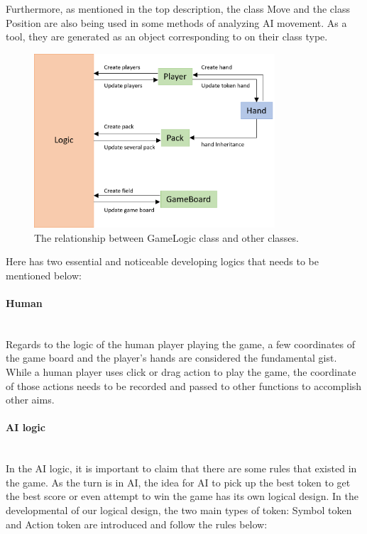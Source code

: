 Furthermore, as mentioned in the top description, the class Move and the class Position are also being used in some methods of analyzing AI movement.  As a tool, they are generated as an object corresponding to on their class type.


\begin{figure}[h]
	\centering
	\includegraphics[width=0.8\textwidth]{image/diagram_4}
	\caption{The relationship between GameLogic class and other classes.}
	\label{fig:gameLogic}
\end{figure}


Here has two essential and noticeable developing logics that needs to be mentioned below:

\paragraph{Human} \mbox{}\\
Regards to the logic of the human player playing the game, a few coordinates of the game board and the player's hands are considered the fundamental gist. While a human player uses click or drag action to play the game, the coordinate of those actions needs to be recorded and passed to other functions to accomplish other aims.

\paragraph{AI logic}\mbox{}\\
In the AI logic, it is important to claim that there are some rules that existed in the game. As the turn is in AI, the idea for AI to pick up the best token to get the best score or even attempt to win the game has its own logical design.
In the developmental of our logical design, the two main types of token: Symbol token and Action token are introduced and follow the rules below:   


